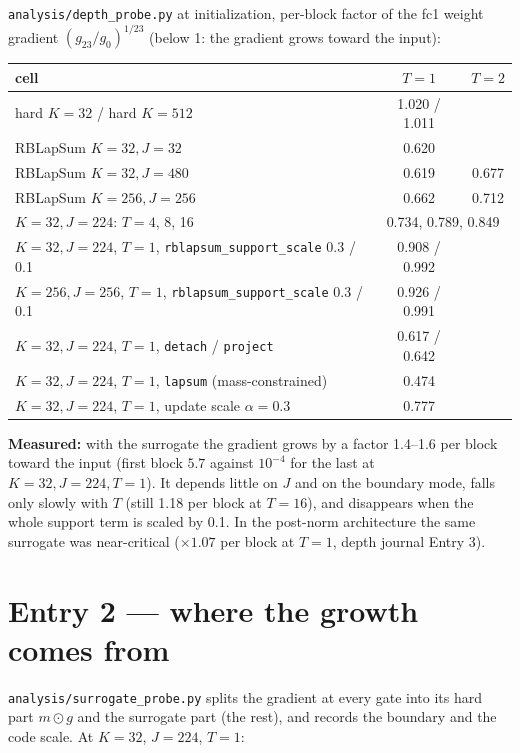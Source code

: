 \documentclass[11pt,a4paper]{article}
\newcommand{\code}[1]{\texttt{#1}}
\begin{document}
\code{analysis/depth\_probe.py} at initialization, per-block factor of the fc1 weight gradient
\((g_{23}/g_0)^{1/23}\) (below 1: the gradient grows toward the input):

\begin{center}\small
\begin{tabular}{lcc}
\toprule
cell & \(T=1\) & \(T=2\) \\
\midrule
hard \(K=32\) / hard \(K=512\) & 1.020 / 1.011 & \\
RBLapSum \(K=32,J=32\)         & 0.620 & \\
RBLapSum \(K=32,J=480\)        & 0.619 & 0.677 \\
RBLapSum \(K=256,J=256\)       & 0.662 & 0.712 \\
\(K=32,J=224\): \(T=4\), 8, 16 & \multicolumn{2}{c}{0.734, 0.789, 0.849} \\
\(K=32,J=224\), \(T=1\), \code{rblapsum\_support\_scale} 0.3 / 0.1 & 0.908 / 0.992 & \\
\(K=256,J=256\), \(T=1\), \code{rblapsum\_support\_scale} 0.3 / 0.1 & 0.926 / 0.991 & \\
\(K=32,J=224\), \(T=1\), \code{detach} / \code{project} & 0.617 / 0.642 & \\
\(K=32,J=224\), \(T=1\), \code{lapsum} (mass-constrained) & 0.474 & \\
\(K=32,J=224\), \(T=1\), update scale \(\alpha=0.3\) & 0.777 & \\
\bottomrule
\end{tabular}
\end{center}

\textbf{Measured:} with the surrogate the gradient grows by a factor 1.4--1.6 per block toward the input (first
block \(5.7\) against \(10^{-4}\) for the last at \(K=32,J=224,T=1\)).  It depends little on \(J\) and on the
boundary mode, falls only slowly with \(T\) (still 1.18 per block at \(T=16\)), and disappears when the whole
support term is scaled by 0.1.  In the post-norm architecture the same surrogate was near-critical (\(\times1.07\)
per block at \(T=1\), depth journal Entry 3).

\section{Entry 2 --- where the growth comes from}

\code{analysis/surrogate\_probe.py} splits the gradient at every gate into its hard part \(m\odot g\) and the
surrogate part (the rest), and records the boundary and the code scale.  At \(K=32\), \(J=224\), \(T=1\):
\end{document}
